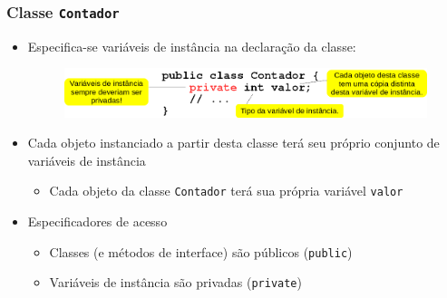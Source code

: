\documentclass[xcolor={dvipsnames,table},aspectratio=169]{beamer}
\begin{document}
\begin{frame}\frametitle{Classe \texttt{Contador}}
\begin{itemize}
	\item Especifica-se variáveis de instância na declaração da classe:
\begin{figure}[h]
	\includegraphics[height=0.2\paperheight,center]{pucrs-ep-fprog-unidade_07-objetos_e_classes-laminas-classe_contador.png}
\end{figure}
	\item Cada objeto instanciado a partir desta classe terá seu próprio conjunto de variáveis de instância
	\begin{itemize}
		\item Cada objeto da classe \texttt{Contador} terá sua própria variável \texttt{valor}
	\end{itemize}
	\item Especificadores de acesso
	\begin{itemize}
		\item Classes (e métodos de interface) são públicos (\texttt{public})
		\item Variáveis de instância são privadas (\texttt{private})
	\end{itemize}
\end{itemize}
\end{frame}
\end{document}
